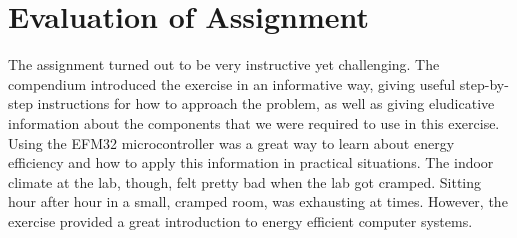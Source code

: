 \section{Evaluation of Assignment}

The assignment turned out to be very instructive yet challenging. The compendium \cite{eeds-compendium} introduced the exercise in an informative way, giving useful step-by-step instructions for how to approach the problem, as well as giving eludicative information about the components that we were required to use in this exercise. Using the EFM32 microcontroller was a great way to learn about energy efficiency and how to apply this information in practical situations. The indoor climate at the lab, though, felt pretty bad when the lab got cramped. Sitting hour after hour in a small, cramped room, was exhausting at times. However, the exercise provided a great introduction to energy efficient computer systems. 
